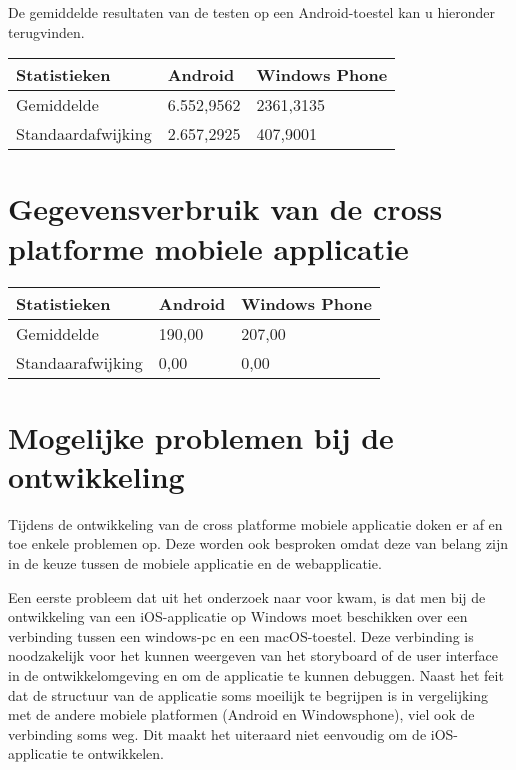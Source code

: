De gemiddelde resultaten van de testen op een Android-toestel kan u hieronder terugvinden.
\begin{center}
\begin{tabular}{| l | l | l | }
  \hline
  Statistieken & Android & Windows Phone \\ \hline
  Gemiddelde & 6.552,9562 & 2361,3135 \\ \hline
  Standaardafwijking & 2.657,2925 & 407,9001 \\
  \hline
\end{tabular}
\end{center}

\section{Gegevensverbruik van de cross platforme mobiele applicatie}

\begin{center}
\begin{tabular}{| l | l | l |}
  \hline
  Statistieken & Android & Windows Phone \\ \hline
  Gemiddelde & 190,00 & 207,00 \\ \hline
  Standaarafwijking & 0,00 & 0,00 \\ \hline
\end{tabular}
\end{center}

\section{Mogelijke problemen bij de ontwikkeling}
Tijdens de ontwikkeling van de cross platforme mobiele applicatie doken er af en toe enkele problemen op.
Deze worden ook besproken omdat deze van belang zijn in de keuze tussen de mobiele applicatie en de webapplicatie.

Een eerste probleem dat uit het onderzoek naar voor kwam, is dat men bij de ontwikkeling van een iOS-applicatie op Windows moet beschikken
over een verbinding tussen een windows-pc en een macOS-toestel. Deze verbinding is noodzakelijk voor het kunnen weergeven van
het storyboard of de user interface in de ontwikkelomgeving en om de applicatie te kunnen debuggen. Naast het feit dat de structuur van de applicatie
soms moeilijk te begrijpen is in vergelijking met de andere mobiele platformen (Android en Windowsphone), viel ook de verbinding soms weg.
Dit maakt het uiteraard niet eenvoudig om de iOS-applicatie te ontwikkelen.
